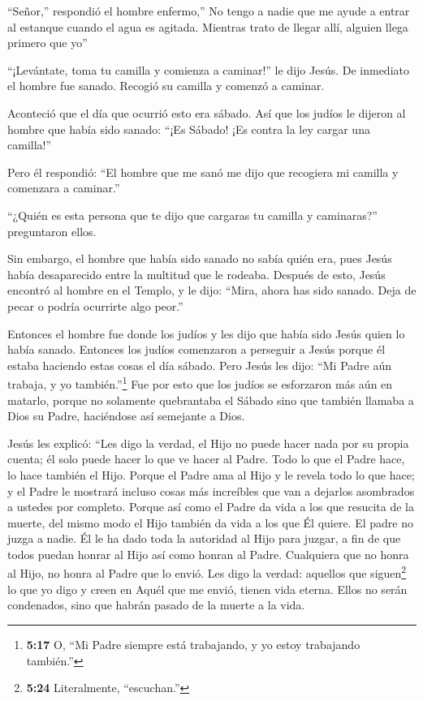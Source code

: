  ``Señor,'' respondió el hombre enfermo,'' No tengo a nadie
que me ayude a entrar al estanque cuando el agua es agitada. Mientras
trato de llegar allí, alguien llega primero que yo''

 ``¡Levántate, toma tu camilla y comienza a caminar!'' le
dijo Jesús.  De inmediato el hombre fue sanado. Recogió su
camilla y comenzó a caminar.

Aconteció que el día que ocurrió esto era sábado.  Así que
los judíos le dijeron al hombre que había sido sanado: ``¡Es Sábado! ¡Es
contra la ley cargar una camilla!''

 Pero él respondió: ``El hombre que me sanó me dijo que
recogiera mi camilla y comenzara a caminar.''

 ``¿Quién es esta persona que te dijo que cargaras tu
camilla y caminaras?'' preguntaron ellos.

 Sin embargo, el hombre que había sido sanado no sabía
quién era, pues Jesús había desaparecido entre la multitud que le
rodeaba.  Después de esto, Jesús encontró al hombre en el
Templo, y le dijo: ``Mira, ahora has sido sanado. Deja de pecar o podría
ocurrirte algo peor.''

 Entonces el hombre fue donde los judíos y les dijo que
había sido Jesús quien lo había sanado.  Entonces los
judíos comenzaron a perseguir a Jesús porque él estaba haciendo estas
cosas el día sábado.  Pero Jesús les dijo: ``Mi Padre aún
trabaja, y yo también.''\footnote{\textbf{5:17} O, ``Mi Padre siempre
  está trabajando, y yo estoy trabajando también.''}  Fue
por esto que los judíos se esforzaron más aún en matarlo, porque no
solamente quebrantaba el Sábado sino que también llamaba a Dios su
Padre, haciéndose así semejante a Dios.

 Jesús les explicó: ``Les digo la verdad, el Hijo no puede
hacer nada por su propia cuenta; él solo puede hacer lo que ve hacer al
Padre. Todo lo que el Padre hace, lo hace también el Hijo. 
Porque el Padre ama al Hijo y le revela todo lo que hace; y el Padre le
mostrará incluso cosas más increíbles que van a dejarlos asombrados a
ustedes por completo.  Porque así como el Padre da vida a
los que resucita de la muerte, del mismo modo el Hijo también da vida a
los que Él quiere.  El padre no juzga a nadie. Él le ha
dado toda la autoridad al Hijo para juzgar,  a fin de que
todos puedan honrar al Hijo así como honran al Padre. Cualquiera que no
honra al Hijo, no honra al Padre que lo envió.  Les digo la
verdad: aquellos que siguen\footnote{\textbf{5:24} Literalmente,
  ``escuchan.''} lo que yo digo y creen en Aquél que me envió, tienen
vida eterna. Ellos no serán condenados, sino que habrán pasado de la
muerte a la vida.

